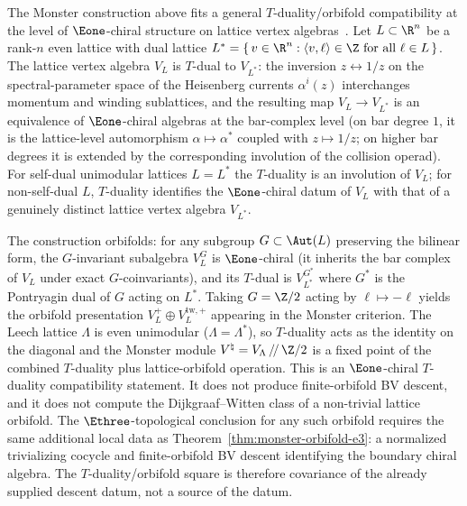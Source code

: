\begin{remark}
\label{rem:t-duality-lattice-voa}
The Monster construction above fits a general
$T$-duality/orbifold compatibility at the level of
$\Eone$-chiral structure on lattice vertex
algebras~\cite{FLM88,Borcherds92}. Let
$L \subset \R^n$ be a rank-$n$ even lattice with dual
lattice $L^* = \{\,v \in \R^n : \langle v, \ell \rangle \in \Z
\text{ for all } \ell \in L\,\}$. The lattice vertex algebra
$V_L$ is $T$-dual to $V_{L^*}$: the inversion
$z \leftrightarrow 1/z$ on the spectral-parameter space of
the Heisenberg currents $\alpha^i(z)$ interchanges momentum
and winding sublattices, and the resulting map
$V_L \to V_{L^*}$ is an equivalence of
$\Eone$-chiral algebras at the bar-complex level (on bar
degree $1$, it is the lattice-level automorphism
$\alpha \mapsto \alpha^*$ coupled with $z \mapsto 1/z$; on
higher bar degrees it is extended by the corresponding
involution of the collision operad). For self-dual
unimodular lattices $L = L^*$ the $T$-duality is an
involution of $V_L$; for non-self-dual $L$, $T$-duality
identifies the $\Eone$-chiral datum of $V_L$ with that of a
genuinely distinct lattice vertex algebra $V_{L^*}$.

The construction orbifolds: for any subgroup
$G \subset \Aut(L)$ preserving the bilinear form, the
$G$-invariant subalgebra $V_L^G$ is $\Eone$-chiral (it
inherits the bar complex of $V_L$ under exact
$G$-coinvariants), and its $T$-dual is $V_{L^*}^{G^*}$ where
$G^*$ is the Pontryagin dual of $G$ acting on $L^*$. Taking
$G = \Z/2$ acting by $\ell \mapsto -\ell$ yields the
orbifold presentation $V_L^{+} \oplus V_L^{\mathrm{tw},+}$
appearing in the Monster criterion. The Leech lattice $\Lambda$ is
even unimodular
($\Lambda = \Lambda^*$), so $T$-duality acts as the identity
on the diagonal and the Monster module
$V^\natural = V_\Lambda \,/\!/\, \Z/2$ is a fixed point of
the combined $T$-duality plus lattice-orbifold operation.
This is an $\Eone$-chiral $T$-duality compatibility statement. It does
not produce finite-orbifold BV descent, and it does not compute the
Dijkgraaf--Witten class of a non-trivial lattice orbifold. The
$\Ethree$-topological conclusion for any such orbifold requires the
same additional local data as Theorem~\ref{thm:monster-orbifold-e3}: a
normalized trivializing cocycle and finite-orbifold BV descent
identifying the boundary chiral algebra. The $T$-duality/orbifold
square is therefore covariance of the already supplied descent datum,
not a source of the datum.
\end{remark}

